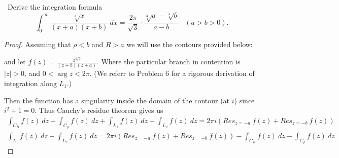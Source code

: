 \documentclass[11pt]{amsart}
\theoremstyle{definition}
\numberwithin{theorem}{section}
\numberwithin{definition}{section}
\numberwithin{equation}{section}
\newcommand{\parens}[1]{ \left( #1 \right) }
\begin{document}
\medskip {}\ Derive the integration formula
\begin{equation*}
	\int_0^\infty \frac{\sqrt[3]{x}}{(x+a)(x+b)}\ dx = \frac{2\pi}{\sqrt{3}} \cdot \frac{\sqrt[3]{a} - \sqrt[3]{b}}{a -b} \;\;\;(a > b > 0).
\end{equation*}
\begin{proof}

	Assuming that $\rho < b$ and $R > a$ we will use the contours provided below:
\begin{center}
\end{center}
	and let $f(z) = \frac{z^{1/3}}{(z+b)(z+a)}$. Where the particular branch in contention is $|z| > 0$, and $0 < \arg z < 2\pi$. (We referr to Problem 6 for a rigorous derivation of integration along $L_1$.)

	Then the function has a singularity inside the domain of the contour (at $i$) since $i^2 + 1 = 0$. Thus
	Cauchy's residue theorem gives us
	\begin{equation*}
	\begin{aligned}
		\int_{C_R} f(z)\ dz + \int_{C_\rho} f(z)\ dz + \int_{L_1} f(z)\ dz  + \int_{L_2} f(z)\ dz = 2\pi i \parens{Res_{z = -a}\ f(z) +   Res_{z = -b}\ f(z)}  \\
		\int_{L_1} f(z)\ dz  + \int_{L_2} f(z)\ dz  = 2\pi i \parens{Res_{z = -a}\ f(z) +   Res_{z = -b}\ f(z)}   -\int_{C_R} f(z)\ dz  -\int_{C_\rho} f(z)\ dz 
	\end{aligned}
	\end{equation*}


\end{proof}
\end{document}
